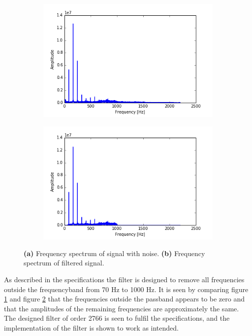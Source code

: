 \begin{figure}[H]
\centering
\begin{subfigure}{0.49\textwidth}
\centering
\includegraphics[width=\textwidth]{figures/filtertest/SIGNAL.png}
\caption{}
\label{fig:SIGNAL}
\end{subfigure}
\begin{subfigure}{0.49\textwidth}
\centering
\includegraphics[width=\textwidth]{figures/filtertest/f_SIGNAL.png}
\caption{}
\label{fig:filt_SIGNAL}
\end{subfigure}
\caption{\textbf{(a)} Frequency spectrum of signal with noise. \textbf{(b)} Frequency spectrum of filtered signal.}
\label{fig:test_res}
\end{figure}
As described in the specifications the filter is designed to remove all frequencies outside the frequencyband from 70 Hz to 1000 Hz. It is seen by comparing figure \ref{fig:SIGNAL} and figure \ref{fig:filt_SIGNAL} that the frequencies outside the passband appears to be zero and that the amplitudes of the remaining frequencies are approximately the same. \\
The designed filter of order 2766 is seen to fulfil the specifications, and the implementation of the filter is shown to work as intended. \\